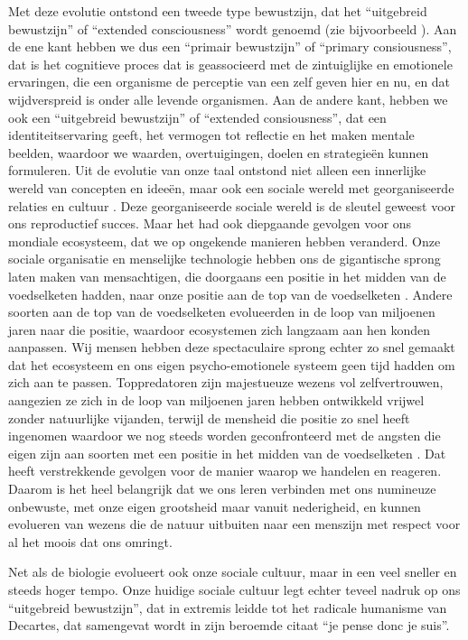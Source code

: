 \documentclass[
  11pt,
]{book}
\begin{document}
Met deze evolutie ontstond een tweede type bewustzijn, dat het ``uitgebreid bewustzijn'' of ``extended consciousness'' wordt genoemd (zie bijvoorbeeld \citet{capraLuisi2014}). Aan de ene kant hebben we dus een ``primair bewustzijn'' of ``primary consiousness'', dat is het cognitieve proces dat is geassocieerd met de zintuiglijke en emotionele ervaringen, die een organisme de perceptie van een zelf geven hier en nu, en dat wijdverspreid is onder alle levende organismen. Aan de andere kant, hebben we ook een ``uitgebreid bewustzijn'' of ``extended consiousness'', dat een identiteitservaring geeft, het vermogen tot reflectie en het maken mentale beelden, waardoor we waarden, overtuigingen, doelen en strategieën kunnen formuleren. Uit de evolutie van onze taal ontstond niet alleen een innerlijke wereld van concepten en ideeën, maar ook een sociale wereld met georganiseerde relaties en cultuur \citep{capraLuisi2014}.
Deze georganiseerde sociale wereld is de sleutel geweest voor ons reproductief succes. Maar het had ook diepgaande gevolgen voor ons mondiale ecosysteem, dat we op ongekende manieren hebben veranderd. Onze sociale organisatie en menselijke technologie hebben ons de gigantische sprong laten maken van mensachtigen, die doorgaans een positie in het midden van de voedselketen hadden, naar onze positie aan de top van de voedselketen \citep{Harari2015}. Andere soorten aan de top van de voedselketen evolueerden in de loop van miljoenen jaren naar die positie, waardoor ecosystemen zich langzaam aan hen konden aanpassen. Wij mensen hebben deze spectaculaire sprong echter zo snel gemaakt dat het ecosysteem en ons eigen psycho-emotionele systeem geen tijd hadden om zich aan te passen. Toppredatoren zijn majestueuze wezens vol zelfvertrouwen, aangezien ze zich in de loop van miljoenen jaren hebben ontwikkeld vrijwel zonder natuurlijke vijanden, terwijl de mensheid die positie zo snel heeft ingenomen waardoor we nog steeds worden geconfronteerd met de angsten die eigen zijn aan soorten met een positie in het midden van de voedselketen \citep{Harari2015}. Dat heeft verstrekkende gevolgen voor de manier waarop we handelen en reageren. Daarom is het heel belangrijk dat we ons leren verbinden met ons numineuze onbewuste, met onze eigen grootsheid maar vanuit nederigheid, en kunnen evolueren van wezens die de natuur uitbuiten naar een menszijn met respect voor al het moois dat ons omringt.

Net als de biologie evolueert ook onze sociale cultuur, maar in een veel sneller en steeds hoger tempo. Onze huidige sociale cultuur legt echter teveel nadruk op ons ``uitgebreid bewustzijn'', dat in extremis leidde tot het radicale humanisme van Decartes, dat samengevat wordt in zijn beroemde citaat ``je pense donc je suis''.
\end{document}
